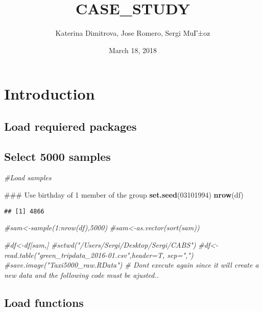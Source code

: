 \documentclass[]{article}
\title{CASE\_STUDY}
\author{Katerina Dimitrova, Jose Romero, Sergi MuГ±oz}
\date{March 18, 2018}
\newenvironment{Shaded}{\begin{snugshade}}{\end{snugshade}}
\newcommand{\KeywordTok}[1]{\textcolor[rgb]{0.13,0.29,0.53}{\textbf{{#1}}}}
\newcommand{\DecValTok}[1]{\textcolor[rgb]{0.00,0.00,0.81}{{#1}}}
\newcommand{\CommentTok}[1]{\textcolor[rgb]{0.56,0.35,0.01}{\textit{{#1}}}}
\newcommand{\NormalTok}[1]{{#1}}
\begin{document}
\maketitle

\section{Introduction}\label{introduction}

\subsection{Load requiered packages}\label{load-requiered-packages}

\subsection{Select 5000 samples}\label{select-5000-samples}

\begin{Shaded}
\begin{Highlighting}[]
\CommentTok{#Load samples}

\NormalTok{### Use birthday of 1 member of the group}
\KeywordTok{set.seed}\NormalTok{(}\DecValTok{03101994}\NormalTok{)}
\KeywordTok{nrow}\NormalTok{(df)}
\end{Highlighting}
\end{Shaded}

\begin{verbatim}
## [1] 4866
\end{verbatim}

\begin{Shaded}
\begin{Highlighting}[]
\CommentTok{#sam<-sample(1:nrow(df),5000)}
\CommentTok{#sam<-as.vector(sort(sam))}

\CommentTok{#df<-df[sam,]}
\CommentTok{#setwd("/Users/Sergi/Desktop/Sergi/CABS")}
\CommentTok{#df<-read.table("green_tripdata_2016-01.csv",header=T, sep=",")}
\CommentTok{#save.image("Taxi5000_raw.RData") # Dont execute again since it will create a new data and the following code must be ajusted..}
\end{Highlighting}
\end{Shaded}

\subsection{Load functions}\label{load-functions}
\end{document}
